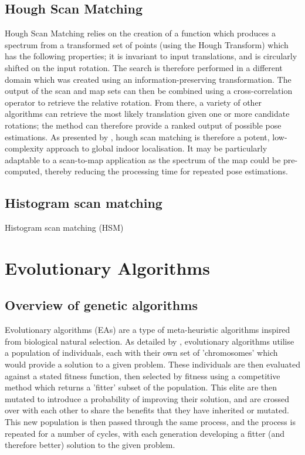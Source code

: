 \documentclass[authoryearcitations]{UoYCSproject}
\begin{document}
\subsection{Hough Scan Matching}
Hough Scan Matching relies on the creation of a function which produces a spectrum from a transformed set of points (using the Hough Transform) which has the following properties; it is invariant to input translations, and is circularly shifted on the input rotation. The search is therefore performed in a different domain which was created using an information-preserving transformation. The output of the scan and map sets can then be combined using a cross-correlation operator to retrieve the relative rotation. From there, a variety of other algorithms can retrieve the most likely translation given one or more candidate rotations; the method can therefore provide a ranked output of possible pose estimations. As presented by \citet{Censi2005-iv}, hough scan matching is therefore a potent, low-complexity approach to global indoor localisation. It may be particularly adaptable to a scan-to-map application as the spectrum of the map could be pre-computed, thereby reducing the processing time for repeated pose estimations.

\subsection{Histogram scan matching}
Histogram scan matching (HSM) 
\section{Evolutionary Algorithms}
\label{sec:evo_approaches}
\subsection{Overview of genetic algorithms}
Evolutionary algorithms (EAs) are a type of meta-heuristic algorithms inspired from biological natural selection. As detailed by \citet{Whitley1994-tx}, evolutionary algorithms utilise a population of individuals, each with their own set of 'chromosomes' which would provide a solution to a given problem. These individuals are then evaluated against a stated fitness function, then selected by fitness using a competitive method which returns a 'fitter' subset of the population. This elite are then mutated to introduce a probability of improving their solution, and are crossed over with each other to share the benefits that they have inherited or mutated. This new population is then passed through the same process, and the process is repeated for a number of cycles, with each generation developing a fitter (and therefore better) solution to the given problem. 
\end{document}
